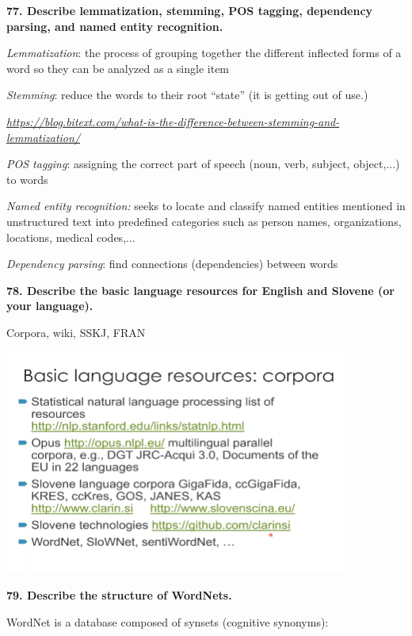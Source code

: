 \textbf{77. Describe lemmatization, stemming, POS tagging, dependency
parsing, and named entity recognition.}

\textit{Lemmatization}: the process of grouping together the
different inflected forms of a word so they can be analyzed as a single
item

\textit{Stemming}: reduce the words to their root ``state'' (it is
getting out of use.)

\href{https://blog.bitext.com/what-is-the-difference-between-stemming-and-lemmatization/}{\textit{https://blog.bitext.com/what-is-the-difference-between-stemming-and-lemmatization/}}

\textit{POS tagging}: assigning the correct part of speech (noun,
verb, subject, object,...) to words

\textit{Named entity recognition:} seeks to locate and classify named
entities mentioned in unstructured text into predefined categories such
as person names, organizations, locations, medical codes,...

\textit{Dependency parsing}: find connections (dependencies) between
words

\textbf{78. Describe the basic language resources for English and
Slovene (or your language).}

Corpora, wiki, SSKJ, FRAN

\includegraphics[width=4.45715in,height=2.90953in]{media/image16.png}

\textbf{79. Describe the structure of WordNets.}

WordNet is a database composed of synsets (cognitive synonyms):

